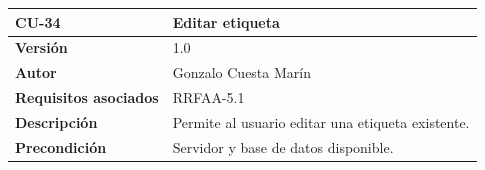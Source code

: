 \documentclass[
]{article}
\begin{document}
\begin{longtable}[]{@{}ll@{}}
\toprule
\begin{minipage}[b]{0.24\columnwidth}\raggedright
\textbf{CU-34}\strut
\end{minipage} & \begin{minipage}[b]{0.70\columnwidth}\raggedright
\textbf{Editar etiqueta}\strut
\end{minipage}\tabularnewline
\midrule
\endhead
\begin{minipage}[t]{0.24\columnwidth}\raggedright
\textbf{Versión}\strut
\end{minipage} & \begin{minipage}[t]{0.70\columnwidth}\raggedright
1.0\strut
\end{minipage}\tabularnewline
\begin{minipage}[t]{0.24\columnwidth}\raggedright
\textbf{Autor}\strut
\end{minipage} & \begin{minipage}[t]{0.70\columnwidth}\raggedright
Gonzalo Cuesta Marín\strut
\end{minipage}\tabularnewline
\begin{minipage}[t]{0.24\columnwidth}\raggedright
\textbf{Requisitos asociados}\strut
\end{minipage} & \begin{minipage}[t]{0.70\columnwidth}\raggedright
RRFAA-5.1\strut
\end{minipage}\tabularnewline
\begin{minipage}[t]{0.24\columnwidth}\raggedright
\textbf{Descripción}\strut
\end{minipage} & \begin{minipage}[t]{0.70\columnwidth}\raggedright
Permite al usuario editar una etiqueta existente.\strut
\end{minipage}\tabularnewline
\begin{minipage}[t]{0.24\columnwidth}\raggedright
\textbf{Precondición}\strut
\end{minipage} & \begin{minipage}[t]{0.70\columnwidth}\raggedright
Servidor y base de datos disponible.


\end{minipage}
\end{longtable}
\end{document}

